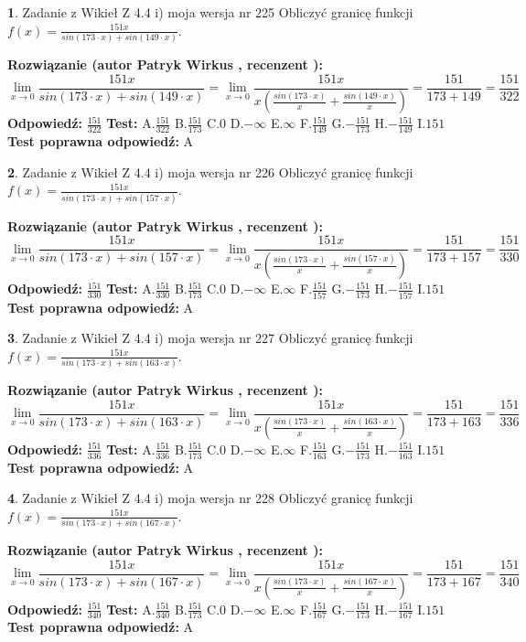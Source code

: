 \documentclass[12pt, a4paper]{article}
\theoremstyle{definition} %
\newtheorem{zad}{}
\newcommand{\zadStart}[1]{\begin{zad}#1\newline}
\newcommand{\zadStop}{\end{zad}}
\newcommand{\rozwStart}[2]{\noindent \textbf{Rozwiązanie (autor #1 , recenzent #2): }\newline}
\newcommand{\rozwStop}{\newline}
\newcommand{\odpStart}{\noindent \textbf{Odpowiedź:}\newline}
\newcommand{\odpStop}{\newline}
\newcommand{\testStart}{\noindent \textbf{Test:}\newline}
\newcommand{\testStop}{\newline}
\newcommand{\kluczStart}{\noindent \textbf{Test poprawna odpowiedź:}\newline}
\newcommand{\kluczStop}{\newline}
\begin{document}
\zadStart{Zadanie z Wikieł Z 4.4 i) moja wersja nr 225}
Obliczyć granicę funkcji $f(x)=\frac{151x}{sin(173\cdot x) +sin(149\cdot x)}$.
\zadStop
\rozwStart{Patryk Wirkus}{}
$$\lim\limits_{x\to 0}\frac{151x}{sin(173\cdot x) +sin(149\cdot x)}=\lim\limits_{x\to 0}\frac{151x}{x(\frac{sin(173\cdot x)}{x}+\frac{sin(149\cdot x)}{x})}=\frac{151}{173+149} = \frac{151}{322}$$
\rozwStop
\odpStart
$\frac{151}{322}$
\odpStop
\testStart
A.$\frac{151}{322}$
B.$\frac{151}{173}$
C.$0$
D.$-\infty$
E.$\infty$
F.$\frac{151}{149}$
G.$-\frac{151}{173}$
H.$-\frac{151}{149}$
I.$151$
\testStop
\kluczStart
A
\kluczStop



\zadStart{Zadanie z Wikieł Z 4.4 i) moja wersja nr 226}
Obliczyć granicę funkcji $f(x)=\frac{151x}{sin(173\cdot x) +sin(157\cdot x)}$.
\zadStop
\rozwStart{Patryk Wirkus}{}
$$\lim\limits_{x\to 0}\frac{151x}{sin(173\cdot x) +sin(157\cdot x)}=\lim\limits_{x\to 0}\frac{151x}{x(\frac{sin(173\cdot x)}{x}+\frac{sin(157\cdot x)}{x})}=\frac{151}{173+157} = \frac{151}{330}$$
\rozwStop
\odpStart
$\frac{151}{330}$
\odpStop
\testStart
A.$\frac{151}{330}$
B.$\frac{151}{173}$
C.$0$
D.$-\infty$
E.$\infty$
F.$\frac{151}{157}$
G.$-\frac{151}{173}$
H.$-\frac{151}{157}$
I.$151$
\testStop
\kluczStart
A
\kluczStop



\zadStart{Zadanie z Wikieł Z 4.4 i) moja wersja nr 227}
Obliczyć granicę funkcji $f(x)=\frac{151x}{sin(173\cdot x) +sin(163\cdot x)}$.
\zadStop
\rozwStart{Patryk Wirkus}{}
$$\lim\limits_{x\to 0}\frac{151x}{sin(173\cdot x) +sin(163\cdot x)}=\lim\limits_{x\to 0}\frac{151x}{x(\frac{sin(173\cdot x)}{x}+\frac{sin(163\cdot x)}{x})}=\frac{151}{173+163} = \frac{151}{336}$$
\rozwStop
\odpStart
$\frac{151}{336}$
\odpStop
\testStart
A.$\frac{151}{336}$
B.$\frac{151}{173}$
C.$0$
D.$-\infty$
E.$\infty$
F.$\frac{151}{163}$
G.$-\frac{151}{173}$
H.$-\frac{151}{163}$
I.$151$
\testStop
\kluczStart
A
\kluczStop



\zadStart{Zadanie z Wikieł Z 4.4 i) moja wersja nr 228}
Obliczyć granicę funkcji $f(x)=\frac{151x}{sin(173\cdot x) +sin(167\cdot x)}$.
\zadStop
\rozwStart{Patryk Wirkus}{}
$$\lim\limits_{x\to 0}\frac{151x}{sin(173\cdot x) +sin(167\cdot x)}=\lim\limits_{x\to 0}\frac{151x}{x(\frac{sin(173\cdot x)}{x}+\frac{sin(167\cdot x)}{x})}=\frac{151}{173+167} = \frac{151}{340}$$
\rozwStop
\odpStart
$\frac{151}{340}$
\odpStop
\testStart
A.$\frac{151}{340}$
B.$\frac{151}{173}$
C.$0$
D.$-\infty$
E.$\infty$
F.$\frac{151}{167}$
G.$-\frac{151}{173}$
H.$-\frac{151}{167}$
I.$151$
\testStop
\kluczStart
A
\kluczStop
\end{document}
